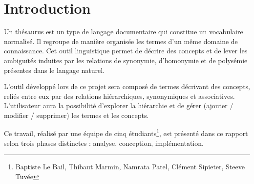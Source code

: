 \chapter*{Introduction}
Un thésaurus est un type de langage documentaire qui constitue un vocabulaire normalisé. Il regroupe de manière organisée les termes d'un même domaine de connaissance. Cet outil linguistique permet de décrire des concepts et de lever les ambiguïtés induites par les relations de synonymie, d'homonymie et de polysémie présentes dans le langage naturel.

L'outil développé lors de ce projet sera composé de termes décrivant des concepts, reliés entre eux par des relations hiérarchiques, synonymiques et associatives. L'utilisateur aura la possibilité d'explorer la hiérarchie et de gérer (ajouter / modifier / supprimer) les termes et les concepts.

Ce travail, réalisé par une équipe de cinq étudiants\footnote{Baptiste Le Bail, Thibaut Marmin, Namrata Patel, Clément Sipieter, Steeve Tuvée}, est présenté dans ce rapport selon trois phases distinctes : analyse, conception, implémentation.